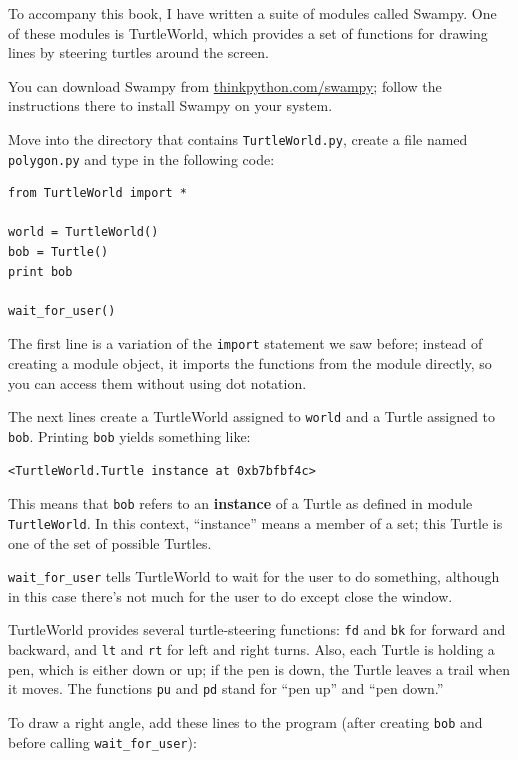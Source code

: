 \documentclass[10pt]{book}
\begin{document}
To accompany this book, I have written a suite of modules called
Swampy.  One of these modules is TurtleWorld, which provides
a set of functions for drawing lines by steering
turtles around the screen.

You can download Swampy from \url{thinkpython.com/swampy};
follow the instructions there to install Swampy on your system.

Move into the directory that contains {\tt TurtleWorld.py},
create a file named {\tt polygon.py} and type in the following
code:

\beforeverb
\begin{verbatim}
from TurtleWorld import *

world = TurtleWorld()
bob = Turtle()
print bob

wait_for_user()
\end{verbatim}
\afterverb
%
The first line is a variation of the {\tt import} statement we saw before;
instead of creating a module object, it imports the functions
from the module directly, so you can access them without using dot
notation.


The next lines create a TurtleWorld assigned to {\tt world} and
a Turtle assigned to {\tt bob}.  Printing {\tt bob} yields something
like:

\beforeverb
\begin{verbatim}
<TurtleWorld.Turtle instance at 0xb7bfbf4c>
\end{verbatim}
\afterverb
%
This means that {\tt bob} refers to
an {\bf instance} of a Turtle
as defined in module {\tt TurtleWorld}.  In this context,
``instance'' means a member of a set;
this Turtle is one of the set of possible Turtles.


\verb"wait_for_user" tells TurtleWorld to wait for the user
to do something, although in this case there's not much for
the user to do except close the window.

TurtleWorld provides several
turtle-steering functions: {\tt fd} and {\tt bk} for
forward and backward, and {\tt lt} and {\tt rt} for left and
right turns.  Also, each Turtle is holding a pen, which is
either down or up; if the pen is down, the Turtle leaves
a trail when it moves.  The functions {\tt pu} and {\tt pd}
stand for ``pen up'' and ``pen down.''

To draw a right angle, add these lines to the program
(after creating {\tt bob} and before calling \verb"wait_for_user"):
\end{document}
